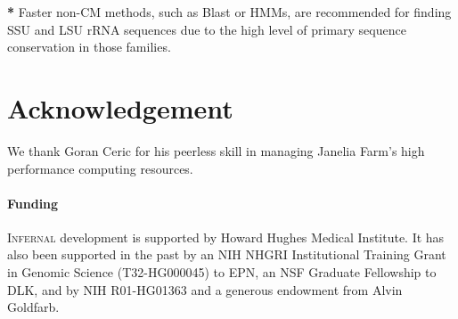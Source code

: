 \documentclass{bioinfo}
\begin{document}
\begin{application}
\begin{table}[!t]
%
{}{\textbf{*} 
  Faster non-CM methods, such as Blast or HMMs, are
  recommended for finding SSU and LSU rRNA sequences due to the
  high level of primary sequence conservation in those families.}
\end{table}

\section*{Acknowledgement}

We thank Goran Ceric for his peerless skill in managing Janelia Farm's
high performance computing resources.

\paragraph{Funding\textcolon} 
\textsc{Infernal} development is supported by Howard Hughes Medical
Institute. It has also been supported in the past by an NIH NHGRI
Institutional Training Grant in Genomic Science (T32-HG000045) to EPN,
an NSF Graduate Fellowship to DLK, and by NIH R01-HG01363 and a
generous endowment from Alvin Goldfarb. 

%
%

%


\end{application}
\end{document}
